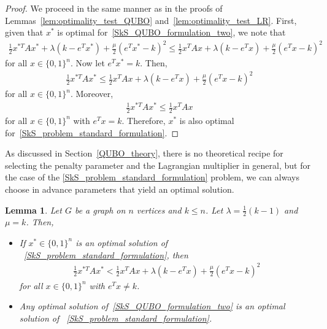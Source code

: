 \documentclass{article}
\newtheorem{lem}[thm]{Lemma}
\begin{document}
\begin{proof}
We proceed in the same manner as in the proofs of Lemmas~\ref{lem:optimality_test_QUBO} and~\ref{lem:optimality_test_LR}. First, given that $x^*$ is optimal for~\eqref{SkS_QUBO_formulation_two}, we note that
\begin{align*}
\frac{1}{2}x^{*T} A x^* + \lambda (k - e^T x^*) + \frac{\mu}{2}(e^Tx^* - k)^2 \leq \frac{1}{2} x^T A x + \lambda (k - e^T x) + \frac{\mu}{2}(e^Tx - k)^2
\end{align*}
for all $x \in \{0,1\}^n$. Now let $e^T x^* = k$. Then, 
\begin{align*}
\frac{1}{2} x^{*T} A x^* \leq \frac{1}{2} x^T A x + \lambda (k - e^T x) + \frac{\mu}{2}(e^Tx - k)^2
\end{align*}
for all $x \in \{0,1\}^n$. Moreover,
\begin{align*}
\frac{1}{2}x^{*T} A x^* \leq \frac{1}{2} x^T A x 
\end{align*}
for all $x \in \{0,1\}^n$ with $e^T x = k$. Therefore, $x^*$ is also optimal  for~\eqref{SkS_problem_standard_formulation}.
\end{proof}

As discussed in Section~\ref{QUBO_theory}, there is no theoretical recipe for selecting the penalty parameter and the Lagrangian multiplier in general, but for the case of the \ref{SkS_problem_standard_formulation} problem, we can always choose in advance parameters that 
yield an optimal solution.\\

\begin{lem}\label{lemma_ALM_SkS}
Let $G$ be a graph on $n$ vertices and $k \leq n$. Let  $\lambda = \frac{1}{2}(k-1)$ and  $\mu = k$.
Then,
\begin{itemize}
    \item [(i)]
    If  $x^* \in \{0, 1\}^n$ is  an optimal solution of ~\eqref{SkS_problem_standard_formulation}, then
\begin{align}\label{ALM_SkS}
\frac{1}{2} x^{*T} A x^* < \frac{1}{2}x^TAx + \lambda(k - e^T x) + \frac{\mu}{2}(e^Tx - k)^2
\end{align}
for all $x \in \{0, 1\}^n$ with $e^Tx \neq k$. 
\item [(ii)] Any optimal solution of~\eqref{SkS_QUBO_formulation_two}  is an optimal solution of ~\eqref{SkS_problem_standard_formulation}.
\end{itemize}
\end{lem} 
\end{document}
